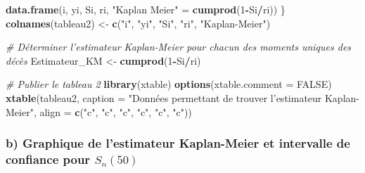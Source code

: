 \documentclass[]{article}
\newenvironment{Shaded}{\begin{snugshade}}{\end{snugshade}}
\newcommand{\KeywordTok}[1]{\textcolor[rgb]{0.13,0.29,0.53}{\textbf{#1}}}
\newcommand{\DataTypeTok}[1]{\textcolor[rgb]{0.13,0.29,0.53}{#1}}
\newcommand{\DecValTok}[1]{\textcolor[rgb]{0.00,0.00,0.81}{#1}}
\newcommand{\StringTok}[1]{\textcolor[rgb]{0.31,0.60,0.02}{#1}}
\newcommand{\CommentTok}[1]{\textcolor[rgb]{0.56,0.35,0.01}{\textit{#1}}}
\newcommand{\OtherTok}[1]{\textcolor[rgb]{0.56,0.35,0.01}{#1}}
\newcommand{\OperatorTok}[1]{\textcolor[rgb]{0.81,0.36,0.00}{\textbf{#1}}}
\newcommand{\NormalTok}[1]{#1}
\begin{document}
\begin{Shaded}
\begin{Highlighting}[]
    \KeywordTok{data.frame}\NormalTok{(i, yi, Si, ri, }\StringTok{"Kaplan Meier"}\NormalTok{ =}\StringTok{ }\KeywordTok{cumprod}\NormalTok{(}\DecValTok{1}\OperatorTok{-}\NormalTok{Si}\OperatorTok{/}\NormalTok{ri))}
\NormalTok{\}}
\KeywordTok{colnames}\NormalTok{(tableau2) <-}\StringTok{ }\KeywordTok{c}\NormalTok{(}\StringTok{"i"}\NormalTok{, }\StringTok{"yi"}\NormalTok{, }\StringTok{"Si"}\NormalTok{, }\StringTok{"ri"}\NormalTok{, }\StringTok{"Kaplan-Meier"}\NormalTok{)}

\CommentTok{# Déterminer l'estimateur Kaplan-Meier pour chacun des moments uniques des décès}
\NormalTok{Estimateur_KM <-}\StringTok{ }\KeywordTok{cumprod}\NormalTok{(}\DecValTok{1}\OperatorTok{-}\NormalTok{Si}\OperatorTok{/}\NormalTok{ri)}

\CommentTok{# Publier le tableau 2 }
\KeywordTok{library}\NormalTok{(xtable)}
\KeywordTok{options}\NormalTok{(}\DataTypeTok{xtable.comment =} \OtherTok{FALSE}\NormalTok{)}
\KeywordTok{xtable}\NormalTok{(tableau2, }\DataTypeTok{caption =} \StringTok{"Données permettant de trouver l'estimateur Kaplan-Meier"}\NormalTok{,  }
                 \DataTypeTok{align =} \KeywordTok{c}\NormalTok{(}\StringTok{"c"}\NormalTok{, }\StringTok{"c"}\NormalTok{, }\StringTok{"c"}\NormalTok{, }\StringTok{"c"}\NormalTok{, }\StringTok{"c"}\NormalTok{, }\StringTok{"c"}\NormalTok{)) }
\end{Highlighting}
\end{Shaded}

\subsubsection{\texorpdfstring{b) Graphique de l'estimateur Kaplan-Meier
et intervalle de confiance pour
\(S_n(50)\)}{b) Graphique de l'estimateur Kaplan-Meier et intervalle de confiance pour S\_n(50)}}\label{b-graphique-de-lestimateur-kaplan-meier-et-intervalle-de-confiance-pour-s_n50-1}
\end{document}

